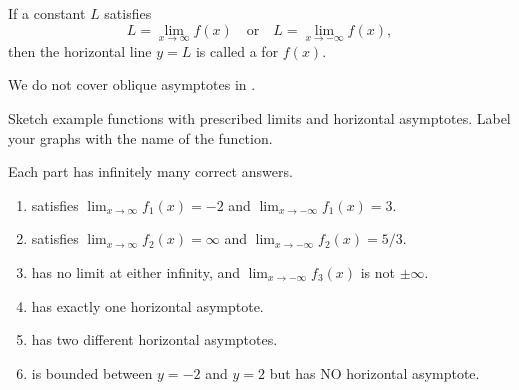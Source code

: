 \documentclass[../main.tex]{subfiles}
\begin{document}
\begin{definition}
  If a constant \(L\) satisfies
  \[
    L = \lim_{x \to \infty} f(x) \quad\text{or}\quad L = \lim_{x \to -\infty} f(x),
  \]
  then the horizontal line \(y = L\) is called a  for \(f(x)\).

\end{definition}

We do not cover oblique asymptotes in \thiscourse{}.

\clearpage
\begin{exercise}
  Sketch example functions with prescribed limits and horizontal asymptotes. Label your graphs with the name of the function.

  Each part has infinitely many correct answers.

  \begin{enumerate}[label=\(f_{\arabic*}\)]
    \item satisfies \(\lim_{x \to \infty} f_{1}(x) = -2\) and \(\lim_{x \to -\infty} f_{1}(x) = 3\).
    \item satisfies \(\lim_{x \to \infty} f_{2}(x) = \infty\) and \(\lim_{x \to -\infty} f_{2}(x) = 5/3\).
      \begin{center}
        
        \qquad
        
      \end{center}

    \item has no limit at either infinity, and \(\lim_{x \to -\infty} f_{3}(x)\) is not \(\pm\infty\).
    \item has exactly one horizontal asymptote.

      \begin{center}
        
        \qquad
        
      \end{center}

    \item has two different horizontal asymptotes.
    \item is bounded between \(y = -2\) and \(y = 2\) but has NO horizontal asymptote.

      \begin{center}
        
        \qquad
        
      \end{center}
  \end{enumerate}

\end{exercise}
\clearpage
\end{document}
